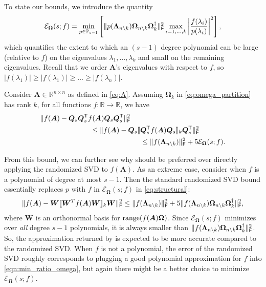 To state our bounds, we introduce the quantity
\begin{equation}
\label{eqn:min_ratio_omega}
    \mathcal{E}_{\bm{\Omega}}(s;f) =
    \min\limits_{p \in \mathbb{P}_{s-1}}\left[\|p(\bm{\Lambda}_{n \setminus k}) \bm{\Omega}_{n \setminus k} \bm{\Omega}_k^{\dagger}\|_{\textsf{\textup{F}}}^2\max\limits_{i=1,\ldots,k} \left|\frac{f(\lambda_i)}{p(\lambda_i)}\right|^2\right],
\end{equation}
which quantifies the extent to which an $(s-1)$ degree polynomial can be large (relative to $f$) on the eigenvalues $\lambda_1, \ldots, \lambda_k$ and small on the remaining eigenvalues. Recall that we order $\bm{A}$'s eigenvalues with respect to $f$, so $|f(\lambda_1)| \geq |f(\lambda_1)| \geq \ldots \geq |f(\lambda_n)|$.
\begin{lemma}\label{lemma:structural}
    Consider $\bm{A} \in \mathbb{R}^{n \times n}$ as defined in \eqref{eq:A}. Assuming $\bm{\Omega}_k$ in \eqref{eq:omega_partition} has rank $k$, for all functions $f: \mathbb{R} \to \mathbb{R}$, we have
    \begin{align}\label{eq:structural}
        \begin{split}
        &\|f(\bm{A}) - \bm{Q}_s  \bm{Q}_s^\T f(\bm{A})\bm{Q}_s \bm{Q}_s^\T \|_{\F}^2 
        \\&\hspace{7em}\leq \|f(\bm{A}) - \bm{Q}_s \llbracket \bm{Q}_s^\T f(\bm{A})\bm{Q}_s\rrbracket_k \bm{Q}_s^\T\|_{\F}^2 
        \\&\hspace{14em}\leq
        \|f(\bm{\Lambda}_{n \setminus k})\|_{\F}^2 + 5 \mathcal{E}_{\bm{\Omega}}(s;f).
        \end{split}
    \end{align}
\end{lemma}
From this bound, we can further see why  should be preferred over directly applying the randomized SVD to $f(\bm{A})$. As an extreme case, consider when $f$ is a polynomial of degree at most $s-1$. Then the standard randomized SVD bound \cite[Theorem 9.1]{rsvd} essentially replaces $p$ with $f$ in $\mathcal{E}_{\bm{\Omega}}(s;f)$ in \eqref{eq:structural}:
\begin{equation*}
    \|f(\bm{A}) - \bm{W} \llbracket \bm{W}^T f(\bm{A}) \bm{W} \rrbracket_k \bm{W}\|_{\textsf{\textup{F}}}^2 \leq \|f(\bm{\Lambda}_{n \setminus k})\|_{\textsf{\textup{F}}}^2 + 5 \|f(\bm{\Lambda}_{n \setminus k}) \bm{\Omega}_{n \setminus k} \bm{\Omega}_k^{\dagger}\|_{\textsf{\textup{F}}}^2,
\end{equation*}
where $\bm{W}$ is an orthonormal basis for $\operatorname{range}(f(\bm{A}) \bm{\Omega})$. Since $\mathcal{E}_{\bm{\Omega}}(s;f)$ minimizes over \emph{all} degree $s-1$ polynomials, it is always smaller than  $\|f(\bm{\Lambda}_{n \setminus k}) \bm{\Omega}_{n \setminus k} \bm{\Omega}_k^{\dagger}\|_{\textsf{\textup{F}}}^2$. So, the approximation returned by  is expected to be more accurate compared to the randomized SVD. When $f$ is not a polynomial, the error of the randomized SVD roughly corresponds to plugging a good polynomial approximation for $f$ into \cref{eqn:min_ratio_omega}, but again there might  be a better choice to minimize $\mathcal{E}_{\bm{\Omega}}(s;f)$.

